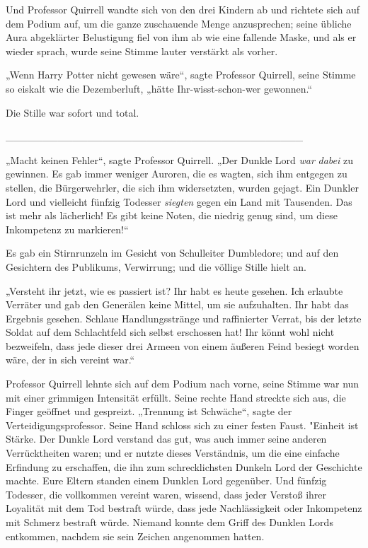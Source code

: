 {Und Professor Quirrell wandte sich von den drei Kindern ab und richtete sich auf dem Podium auf, um die ganze zuschauende Menge anzusprechen; seine übliche Aura abgeklärter Belustigung fiel von ihm ab wie eine fallende Maske, und als er wieder sprach, wurde seine Stimme lauter verstärkt als vorher.

„Wenn Harry Potter nicht gewesen wäre“, sagte Professor Quirrell, seine Stimme so eiskalt wie die Dezemberluft, „hätte Ihr-wisst-schon-wer gewonnen.“

Die Stille war sofort und total.

\_\_\_\_\_\_\_\_\_\_\_\_\_\_\_\_\_\_\_\_\_\_\_\_\_\_\_\_\_\_\_\_\_\_\_\_\_\_\_\_

„Macht keinen Fehler“, sagte Professor Quirrell. „Der Dunkle Lord \emph{war} \emph{dabei} zu gewinnen. Es gab immer weniger Auroren, die es wagten, sich ihm entgegen zu stellen, die Bürgerwehrler, die sich ihm widersetzten, wurden gejagt. Ein Dunkler Lord und vielleicht fünfzig Todesser \emph{siegten} gegen ein Land mit Tausenden. Das ist mehr als lächerlich! Es gibt keine Noten, die niedrig genug sind, um diese Inkompetenz zu markieren!“

Es gab ein Stirnrunzeln im Gesicht von Schulleiter Dumbledore; und auf den Gesichtern des Publikums, Verwirrung; und die völlige Stille hielt an.

„Versteht ihr jetzt, wie es passiert ist? Ihr habt es heute gesehen. Ich erlaubte Verräter und gab den Generälen keine Mittel, um sie aufzuhalten. Ihr habt das Ergebnis gesehen. Schlaue Handlungsstränge und raffinierter Verrat, bis der letzte Soldat auf dem Schlachtfeld sich selbst erschossen hat! Ihr könnt wohl nicht bezweifeln, dass jede dieser drei Armeen von einem äußeren Feind besiegt worden wäre, der in sich vereint war.“

Professor Quirrell lehnte sich auf dem Podium nach vorne, seine Stimme war nun mit einer grimmigen Intensität erfüllt. Seine rechte Hand streckte sich aus, die Finger geöffnet und gespreizt. „Trennung ist Schwäche“, sagte der Verteidigungsprofessor. Seine Hand schloss sich zu einer festen Faust. "Einheit ist Stärke. Der Dunkle Lord verstand das gut, was auch immer seine anderen Verrücktheiten waren; und er nutzte dieses Verständnis, um die eine einfache Erfindung zu erschaffen, die ihn zum schrecklichsten Dunkeln Lord der Geschichte machte. Eure Eltern standen einem Dunklen Lord gegenüber. Und fünfzig Todesser, die vollkommen vereint waren, wissend, dass jeder Verstoß ihrer Loyalität mit dem Tod bestraft würde, dass jede Nachlässigkeit oder Inkompetenz mit Schmerz bestraft würde. Niemand konnte dem Griff des Dunklen Lords entkommen, nachdem sie sein Zeichen angenommen hatten.

}
